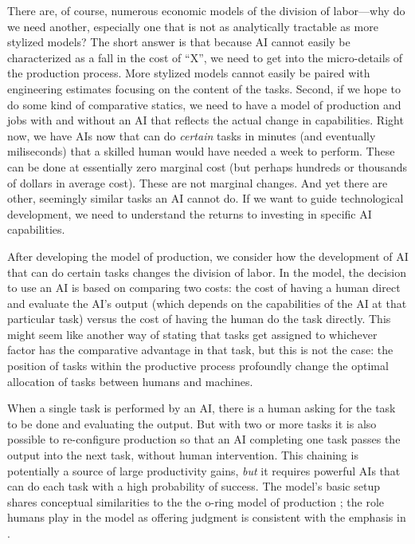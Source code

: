 \documentclass{article}
\theoremstyle{plain}
\theoremstyle{plain}
\begin{document}
There are, of course, numerous economic models of the division of labor\citep{becker1992division, deming2017growing}---why do we need another, especially one that is not as analytically tractable as more stylized models?
The short answer is that because AI cannot easily be characterized as a fall in the cost of ``X'', we need to get into the micro-details of the production process. 
More stylized models cannot easily be paired with engineering estimates focusing on the content of the tasks. 
Second, if we hope to do some kind of comparative statics, we need to have a model of production and jobs with and without an AI that reflects the actual change in capabilities.
Right now, we have AIs now that can do \emph{certain} tasks in minutes (and eventually miliseconds) that a skilled human would have needed a week to perform. 
These can be done at essentially zero marginal cost (but perhaps hundreds or thousands of dollars in average cost). 
These are not marginal changes. 
And yet there are other, seemingly similar tasks an AI cannot do.
If we want to guide technological development, we need to understand the returns to investing in specific AI capabilities.

After developing the model of production, we consider how the development of AI that can do certain tasks changes the division of labor.
In the model, the decision to use an AI is based on comparing two costs: the cost of having a human direct and evaluate the AI's output (which depends on the capabilities of the AI at that particular task) versus the cost of having the human do the task directly.
This might seem like another way of stating that tasks get assigned to whichever factor has the comparative advantage in that task, but this is not the case: the position of tasks within the productive process profoundly change the optimal allocation of tasks between humans and machines.

When a single task is performed by an AI, there is a human asking for the task to be done and evaluating the output.
But with two or more tasks it is also possible to re-configure production so that an AI completing one task passes the output into the next task, without human intervention.
This chaining is potentially a source of large productivity gains, \emph{but} it requires powerful AIs that can do each task with a high probability of success. 
The model's basic setup shares conceptual similarities to the the o-ring model of production \citep{kremer1993}; the role humans play in the model as offering judgment is consistent with the emphasis in \cite{agrawal2019exploring}.
\end{document}
